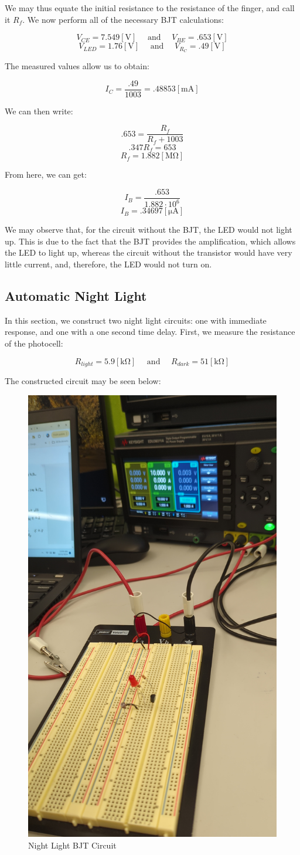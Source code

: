 \documentclass[
	letterpaper, %
	10pt, %
]{CSUniSchoolLabReport}
\begin{document}
We may thus equate the initial resistance to the resistance of the finger, and call it $R_f$. We now perform all of the necessary BJT calculations:

$$V_{CE}=7.549[\si{\volt}]\quad\text{ and }\quad V_{BE}=.653[\si{\volt}]$$
$$V_{LED}=1.76[\si{\volt}]\quad\text{ and }\quad V_{R_C}=.49[\si{\volt}]$$

The measured values allow us to obtain:

$$\boxed{I_C=\frac{.49}{1003}=.48853[\si{\milli\ampere}]}$$

We can then write:

$$.653=\frac{R_f}{R_f+1003}$$
$$.347R_f=653$$
$$\boxed{R_f=1.882[\si{\mega\ohm}]}$$

From here, we can get:

$$I_B=\frac{.653}{1.882\cdot10^6}$$
$$\boxed{I_B=.34697[\si{\micro\ampere}]}$$

We may observe that, for the circuit without the BJT, the LED would not light up. This is due to the fact that the BJT provides the amplification, which allows the LED to light up, whereas the circuit without the transistor would have very little current, and, therefore, the LED would not turn on.

\subsection{Automatic Night Light}

In this section, we construct two night light circuits: one with immediate response, and one with a one second time delay. First, we measure the resistance of the photocell:

$$\boxed{R_{light}=5.9[\si{\kilo\ohm}]\quad\text{ and }\quad R_{dark}=51[\si{\kilo\ohm}]}$$

The constructed circuit may be seen below:

\begin{figure}[H]
  \centering
  \includegraphics[height=.9\textwidth,angle=270]{Figures/L3C1}
  \caption{Night Light BJT Circuit}
  \label{fig:3}
\end{figure}
\end{document}
